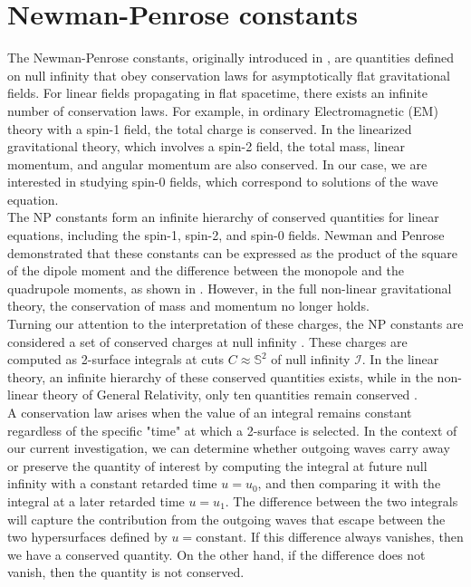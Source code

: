 \section{Newman-Penrose constants}
\label{section:Newman-Penrose Constants}
The Newman-Penrose constants, originally introduced in \cite{NewPen68}, are quantities defined on null infinity that obey conservation laws for asymptotically flat gravitational fields. For linear fields propagating in flat spacetime, there exists an infinite number of conservation laws. For example, in ordinary Electromagnetic (EM) theory with a spin-1 field, the total charge is conserved. In the linearized gravitational theory, which involves a spin-2 field, the total mass, linear momentum, and angular momentum are also conserved. In our case, we are interested in studying spin-0 fields, which correspond to solutions of the wave equation.\\

The NP constants form an infinite hierarchy of conserved quantities for linear equations, including the spin-1, spin-2, and spin-0 fields. Newman and Penrose demonstrated that these constants can be expressed as the product of the square of the dipole moment and the difference between the monopole and the quadrupole moments, as shown in \cite{DaiVal02}. However, in the full non-linear gravitational theory, the conservation of mass and momentum no longer holds.\\

Turning our attention to the interpretation of these charges, the NP constants are considered a set of conserved charges at null infinity \cite{NewPen68}. These charges are computed as 2-surface integrals at cuts ${C} \approx \mathbb{S}^2$ of null infinity $\mathscr{I}$. In the linear theory, an infinite hierarchy of these conserved quantities exists, while in the non-linear theory of General Relativity, only ten quantities remain conserved \cite{NewPen68}.\\

A conservation law arises when the value of an integral remains constant regardless of the specific "time" at which a 2-surface is selected. In the context of our current investigation, we can determine whether outgoing waves carry away or preserve the quantity of interest by computing the integral at future null infinity with a constant retarded time $u = u_0$, and then comparing it with the integral at a later retarded time $u = u_1$. The difference between the two integrals will capture the contribution from the outgoing waves that escape between the two hypersurfaces defined by $u = \text{constant}$. If this difference always vanishes, then we have a conserved quantity. On the other hand, if the difference does not vanish, then the quantity is not conserved.\\

